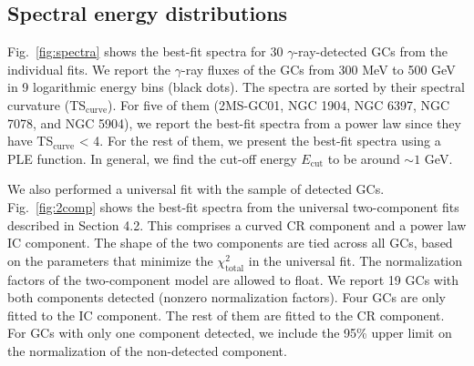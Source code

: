 \documentclass[doublespace,draft,nopageskip]{VTthesis} %
\begin{document}
\begin{appendices}
\clearpage

\section{Spectral energy distributions}\label{appx:spectra}

Fig.~\ref{fig:spectra} shows the best-fit spectra for 30 $\gamma$-ray-detected GCs from the individual fits. We report the $\gamma$-ray fluxes of the GCs from 300 MeV to 500 GeV in 9 logarithmic energy bins (black dots). The spectra are sorted by their spectral curvature (TS$_\mathrm{curve}$). For five of them (2MS-GC01, NGC 1904, NGC 6397, NGC 7078, and NGC 5904), we report the best-fit spectra from a power law since they have TS$_\mathrm{curve}$ < 4. For the rest of them, we present the best-fit spectra using a PLE function. In general, we find the cut-off energy $E_\mathrm{cut}$ to be around $\sim 1$ GeV.

We also performed a universal fit with the sample of detected GCs. Fig.~\ref{fig:2comp} shows the best-fit spectra from the universal two-component fits described in Section 4.2. This comprises a curved CR component and a power law IC component. The shape of the two components are tied across all GCs, based on the parameters that minimize the $\chi^2_\mathrm{total}$ in the universal fit. The normalization factors of the two-component model are allowed to float. We report 19 GCs with both components detected (nonzero normalization factors). Four GCs are only fitted to the IC component. The rest of them are fitted to the CR component. For GCs with only one component detected, we include the 95\% upper limit on the normalization of the non-detected component.


\end{appendices}
\end{document}
